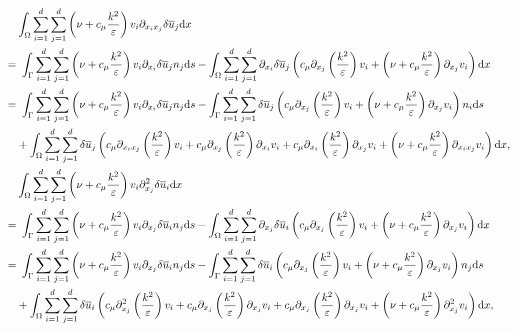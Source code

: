\documentclass[oneside,11pt]{book}
\numberwithin{equation}{section}
\begin{document}
\begin{align*}
    &\int_\Omega \sum_{i=1}^d\sum_{j=1}^d \left(\nu + c_\mu\frac{k^2}{\varepsilon}\right)v_i\partial_{x_ix_j}\delta\overline{u}_j{\rm d}x\\
    =&\ \int_\Gamma \sum_{i=1}^d\sum_{j=1}^d \left(\nu + c_\mu\frac{k^2}{\varepsilon}\right)v_i\partial_{x_i}\delta\overline{u}_jn_j{\rm d}s - \int_\Omega \sum_{i=1}^d\sum_{j=1}^d \partial_{x_i}\delta\overline{u}_j\left(c_\mu\partial_{x_j}\left(\frac{k^2}{\varepsilon}\right)v_i + \left(\nu+ c_\mu\frac{k^2}{\varepsilon}\right)\partial_{x_j}v_i\right){\rm d}x\\
    =&\ \int_\Gamma \sum_{i=1}^d\sum_{j=1}^d \left(\nu + c_\mu\frac{k^2}{\varepsilon}\right)v_i\partial_{x_i}\delta\overline{u}_jn_j{\rm d}s - \int_\Gamma \sum_{i=1}^d\sum_{j=1}^d \delta\overline{u}_j\left(c_\mu\partial_{x_j}\left(\frac{k^2}{\varepsilon}\right)v_i + \left(\nu + c_\mu\frac{k^2}{\varepsilon}\right)\partial_{x_j}v_i\right)n_i{\rm d}s\\
    &+\int_\Omega \sum_{i=1}^d\sum_{j=1}^d \delta\overline{u}_j\left(c_\mu\partial_{x_ix_j}\left(\frac{k^2}{\varepsilon}\right)v_i + c_\mu\partial_{x_j}\left(\frac{k^2}{\varepsilon}\right)\partial_{x_i}v_i + c_\mu\partial_{x_i}\left(\frac{k^2}{\varepsilon}\right)\partial_{x_j}v_i + \left(\nu + c_\mu\frac{k^2}{\varepsilon}\right)\partial_{x_ix_j}v_i\right){\rm d}x,\\
    &\int_\Omega \sum_{i=1}^d\sum_{j=1}^d \left(\nu + c_\mu\frac{k^2}{\varepsilon}\right)v_i\partial_{x_j}^2\delta\overline{u}_i{\rm d}x\\
    =&\ \int_\Gamma \sum_{i=1}^d\sum_{j=1}^d \left(\nu + c_\mu\frac{k^2}{\varepsilon}\right)v_i\partial_{x_j}\delta\overline{u}_in_j{\rm d}s - \int_\Omega \sum_{i=1}^d\sum_{j=1}^d \partial_{x_j}\delta\overline{u}_i\left(c_\mu\partial_{x_j}\left(\frac{k^2}{\varepsilon}\right)v_i + \left(\nu + c_\mu\frac{k^2}{\varepsilon}\right)\partial_{x_j}v_i\right){\rm d}x\\
    =&\ \int_\Gamma \sum_{i=1}^d\sum_{j=1}^d \left(\nu + c_\mu\frac{k^2}{\varepsilon}\right)v_i\partial_{x_j}\delta\overline{u}_in_j{\rm d}s - \int_\Gamma \sum_{i=1}^d\sum_{j=1}^d \delta\overline{u}_i\left(c_\mu\partial_{x_j}\left(\frac{k^2}{\varepsilon}\right)v_i + \left(\nu + c_\mu\frac{k^2}{\varepsilon}\right)\partial_{x_j}v_i\right)n_j{\rm d}s\\
    &+\int_\Omega \sum_{i=1}^d\sum_{j=1}^d \delta\overline{u}_i\left(c_\mu\partial_{x_j}^2\left(\frac{k^2}{\varepsilon}\right)v_i + c_\mu\partial_{x_j}\left(\frac{k^2}{\varepsilon}\right)\partial_{x_j}v_i + c_\mu\partial_{x_j}\left(\frac{k^2}{\varepsilon}\right)\partial_{x_j}v_i + \left(\nu + c_\mu\frac{k^2}{\varepsilon}\right)\partial_{x_j}^2v_i\right){\rm d}x,\\

\end{align*}
\end{document}
